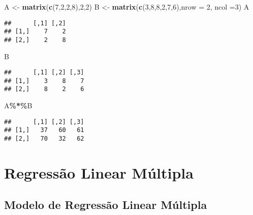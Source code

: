 \documentclass[
]{book}
\newenvironment{Shaded}{\begin{snugshade}}{\end{snugshade}}
\newcommand{\DataTypeTok}[1]{\textcolor[rgb]{0.13,0.29,0.53}{#1}}
\newcommand{\DecValTok}[1]{\textcolor[rgb]{0.00,0.00,0.81}{#1}}
\newcommand{\KeywordTok}[1]{\textcolor[rgb]{0.13,0.29,0.53}{\textbf{#1}}}
\newcommand{\NormalTok}[1]{#1}
\newcommand{\OperatorTok}[1]{\textcolor[rgb]{0.81,0.36,0.00}{\textbf{#1}}}
\newcommand{\StringTok}[1]{\textcolor[rgb]{0.31,0.60,0.02}{#1}}
\begin{document}
\begin{Shaded}
\begin{Highlighting}[]
\NormalTok{A \textless{}{-}}\StringTok{ }\KeywordTok{matrix}\NormalTok{(}\KeywordTok{c}\NormalTok{(}\DecValTok{7}\NormalTok{,}\DecValTok{2}\NormalTok{,}\DecValTok{2}\NormalTok{,}\DecValTok{8}\NormalTok{),}\DecValTok{2}\NormalTok{,}\DecValTok{2}\NormalTok{)}
\NormalTok{B \textless{}{-}}\StringTok{ }\KeywordTok{matrix}\NormalTok{(}\KeywordTok{c}\NormalTok{(}\DecValTok{3}\NormalTok{,}\DecValTok{8}\NormalTok{,}\DecValTok{8}\NormalTok{,}\DecValTok{2}\NormalTok{,}\DecValTok{7}\NormalTok{,}\DecValTok{6}\NormalTok{),}\DataTypeTok{nrow =} \DecValTok{2}\NormalTok{, }\DataTypeTok{ncol =}\DecValTok{3}\NormalTok{)}
\NormalTok{A}
\end{Highlighting}
\end{Shaded}

\begin{verbatim}
##      [,1] [,2]
## [1,]    7    2
## [2,]    2    8
\end{verbatim}

\begin{Shaded}
\begin{Highlighting}[]
\NormalTok{B}
\end{Highlighting}
\end{Shaded}

\begin{verbatim}
##      [,1] [,2] [,3]
## [1,]    3    8    7
## [2,]    8    2    6
\end{verbatim}

\begin{Shaded}
\begin{Highlighting}[]
\NormalTok{A}\OperatorTok{\%*\%}\NormalTok{B}
\end{Highlighting}
\end{Shaded}

\begin{verbatim}
##      [,1] [,2] [,3]
## [1,]   37   60   61
## [2,]   70   32   62
\end{verbatim}

\hypertarget{regressuxe3o-linear-muxfaltipla}{%
\chapter{Regressão Linear Múltipla}\label{regressuxe3o-linear-muxfaltipla}}

\hypertarget{modelo-de-regressuxe3o-linear-muxfaltipla}{%
\section{Modelo de Regressão Linear Múltipla}\label{modelo-de-regressuxe3o-linear-muxfaltipla}}
\end{document}
